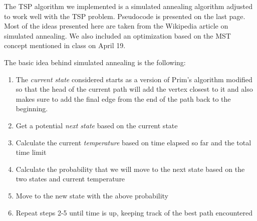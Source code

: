 \documentclass[11pt,letterpaper]{article}
\begin{document}
The TSP algorithm we implemented is a simulated annealing algorithm adjusted to work well with the TSP problem. Pseudocode is presented on the last page. Most of the ideas presented here are taken from the Wikipedia article on simulated annealing. We also included an optimization based on the MST concept mentioned in class on April 19.

The basic idea behind simulated annealing is the following:
\begin{enumerate}
\item The \textit{current state} considered starts as a version of Prim's algorithm modified so that the head of the current path will add the vertex closest to it and also makes sure to add the final edge from the end of the path back to the beginning. 
\item Get a potential \textit{next state} based on the current state 
\item Calculate the current \textit{temperature} based on time elapsed so far and the total time limit 
\item Calculate the probability that we will move to the next state based on the two states and current temperature
\item Move to the new state with the above probability
\item Repeat steps 2-5 until time is up, keeping track of the best path encountered
\end{enumerate}
\end{document}
